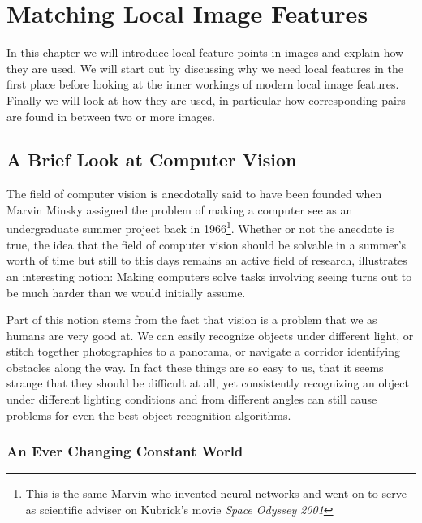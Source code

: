 \chapter{Matching Local Image Features}
\label{C:background}


In this chapter we will introduce local feature points in images and 
explain how they are used. We will start out by discussing why we need 
local features in the first place before looking at the inner workings 
of modern local image features. Finally we will look at how they are 
used, in particular how corresponding pairs are found in between two or 
more images.

\section{A Brief Look at Computer Vision}

The field of computer vision is anecdotally said to have been founded 
when Marvin Minsky assigned the problem of making a computer see as an 
undergraduate summer project back in 1966\footnote{This is the same 
Marvin who invented neural networks and went on to serve as scientific 
adviser on Kubrick's movie \emph{Space Odyssey 2001}}. Whether or not 
the anecdote is true, the idea that the field of computer vision should 
be solvable in a summer's worth of time but still to this days remains 
an active field of research, illustrates an interesting notion: Making 
computers solve tasks involving seeing turns out to be much harder than 
we would initially assume.

Part of this notion stems from the fact that vision is a problem that we 
as humans are very good at. We can easily recognize objects under 
different light, or stitch together photographies to a panorama, or 
navigate a corridor identifying obstacles along the way. In fact these 
things are so easy to us, that it seems strange that they should be 
difficult at all, yet consistently recognizing an object under different 
lighting conditions and from different angles can still cause problems 
for even the best object recognition algorithms.

\subsection{An Ever Changing Constant World}

